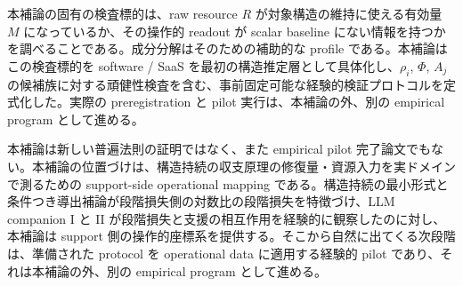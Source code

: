 \documentclass[12pt,a4paper]{article}
\begin{document}
本補論の固有の検査標的は、raw resource \(R\) が対象構造の維持に使える有効量 \(M\) になっているか、その操作的 readout が scalar baseline にない情報を持つかを調べることである。成分分解はそのための補助的な profile である。本補論はこの検査標的を software / SaaS を最初の構造推定層として具体化し、\(\rho_i\), \(\Phi\), \(A_j\) の候補族に対する頑健性検査を含む、事前固定可能な経験的検証プロトコルを定式化した。実際の preregistration と pilot 実行は、本補論の外、別の empirical program として進める。

本補論は新しい普遍法則の証明ではなく、また empirical pilot 完了論文でもない。本補論の位置づけは、構造持続の収支原理の修復量・資源入力を実ドメインで測るための support-side operational mapping である。構造持続の最小形式と条件つき導出補論が段階損失側の対数比の段階損失を特徴づけ、LLM companion I と II が段階損失と支援の相互作用を経験的に観察したのに対し、本補論は support 側の操作的座標系を提供する。そこから自然に出てくる次段階は、準備された protocol を operational data に適用する経験的 pilot であり、それは本補論の外、別の empirical program として進める。
\end{document}
